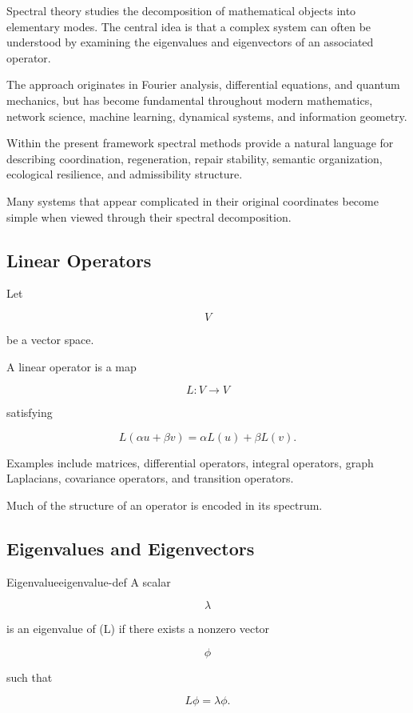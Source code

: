 \documentclass[12pt,twoside,openright]{book}
\begin{document}
Spectral theory studies the decomposition of mathematical
objects into elementary modes. The central idea is that a
complex system can often be understood by examining the
eigenvalues and eigenvectors of an associated operator.

The approach originates in Fourier analysis, differential
equations, and quantum mechanics, but has become
fundamental throughout modern mathematics, network
science, machine learning, dynamical systems, and
information geometry.

Within the present framework spectral methods provide a
natural language for describing coordination,
regeneration, repair stability, semantic organization,
ecological resilience, and admissibility structure.

Many systems that appear complicated in their original
coordinates become simple when viewed through their
spectral decomposition.

\subsection{Linear Operators}

Let

\[
V
\]

be a vector space.

A linear operator is a map

\[
L:V\rightarrow V
\]

satisfying

\[
L(\alpha u+\beta v)
=

\alpha L(u)
+
\beta L(v).
\]

Examples include matrices, differential operators,
integral operators, graph Laplacians, covariance
operators, and transition operators.

Much of the structure of an operator is encoded in its
spectrum.

\subsection{Eigenvalues and Eigenvectors}

\begin{definition}{Eigenvalue}{eigenvalue-def}
A scalar

\[
\lambda
\]

is an eigenvalue of (L) if there exists a nonzero vector

\[
\phi
\]

such that

\[
L\phi
=

\lambda\phi.
\]
\end{definition}
\end{document}

